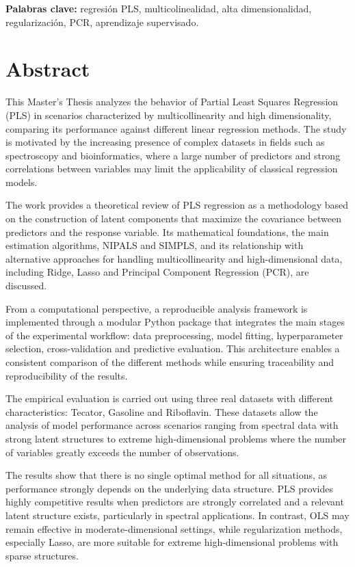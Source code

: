 \documentclass[12pt,a4paper]{report}
\begin{document}
\vspace{0.5cm}

\textbf{Palabras clave:} regresión PLS, multicolinealidad, alta dimensionalidad, regularización, PCR, aprendizaje supervisado.

\cleardoublepage
\chapter*{Abstract}

This Master’s Thesis analyzes the behavior of Partial Least Squares Regression (PLS) in scenarios characterized by multicollinearity and high dimensionality, comparing its performance against different linear regression methods. The study is motivated by the increasing presence of complex datasets in fields such as spectroscopy and bioinformatics, where a large number of predictors and strong correlations between variables may limit the applicability of classical regression models.

The work provides a theoretical review of PLS regression as a methodology based on the construction of latent components that maximize the covariance between predictors and the response variable. Its mathematical foundations, the main estimation algorithms, NIPALS and SIMPLS, and its relationship with alternative approaches for handling multicollinearity and high-dimensional data, including Ridge, Lasso and Principal Component Regression (PCR), are discussed.

From a computational perspective, a reproducible analysis framework is implemented through a modular Python package that integrates the main stages of the experimental workflow: data preprocessing, model fitting, hyperparameter selection, cross-validation and predictive evaluation. This architecture enables a consistent comparison of the different methods while ensuring traceability and reproducibility of the results.

The empirical evaluation is carried out using three real datasets with different characteristics: Tecator, Gasoline and Riboflavin. These datasets allow the analysis of model performance across scenarios ranging from spectral data with strong latent structures to extreme high-dimensional problems where the number of variables greatly exceeds the number of observations.

The results show that there is no single optimal method for all situations, as performance strongly depends on the underlying data structure. PLS provides highly competitive results when predictors are strongly correlated and a relevant latent structure exists, particularly in spectral applications. In contrast, OLS may remain effective in moderate-dimensional settings, while regularization methods, especially Lasso, are more suitable for extreme high-dimensional problems with sparse structures.
\end{document}
